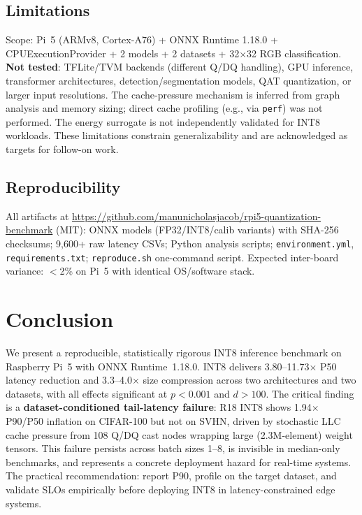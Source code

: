 \documentclass[journal]{IEEEtran}
\begin{document}
\subsection{Limitations}
Scope: Pi~5 (ARMv8, Cortex-A76) + ONNX Runtime 1.18.0 + CPUExecutionProvider + 2 models + 2 datasets + 32$\times$32 RGB classification. \textbf{Not tested}: TFLite/TVM backends (different Q/DQ handling), GPU inference, transformer architectures, detection/segmentation models, QAT quantization, or larger input resolutions. The cache-pressure mechanism is inferred from graph analysis and memory sizing; direct cache profiling (e.g., via \texttt{perf}) was not performed. The energy surrogate is not independently validated for INT8 workloads. These limitations constrain generalizability and are acknowledged as targets for follow-on work.

\subsection{Reproducibility}
All artifacts at \protect\url{https://github.com/manunicholasjacob/rpi5-quantization-benchmark} (MIT): ONNX models (FP32/INT8/calib variants) with SHA-256 checksums; 9,600+ raw latency CSVs; Python analysis scripts; \texttt{environment.yml}, \texttt{requirements.txt}; \texttt{reproduce.sh} one-command script. Expected inter-board variance: $<$2\% on Pi~5 with identical OS/software stack.

\section{Conclusion}

We present a reproducible, statistically rigorous INT8 inference benchmark on Raspberry Pi~5 with ONNX Runtime~1.18.0. INT8 delivers 3.80--11.73$\times$ P50 latency reduction and 3.3--4.0$\times$ size compression across two architectures and two datasets, with all effects significant at $p < 0.001$ and $d > 100$. The critical finding is a \textbf{dataset-conditioned tail-latency failure}: R18 INT8 shows 1.94$\times$ P90/P50 inflation on CIFAR-100 but not on SVHN, driven by stochastic LLC cache pressure from 108 Q/DQ cast nodes wrapping large (2.3M-element) weight tensors. This failure persists across batch sizes 1--8, is invisible in median-only benchmarks, and represents a concrete deployment hazard for real-time systems. The practical recommendation: report P90, profile on the target dataset, and validate SLOs empirically before deploying INT8 in latency-constrained edge systems.
\end{document}
